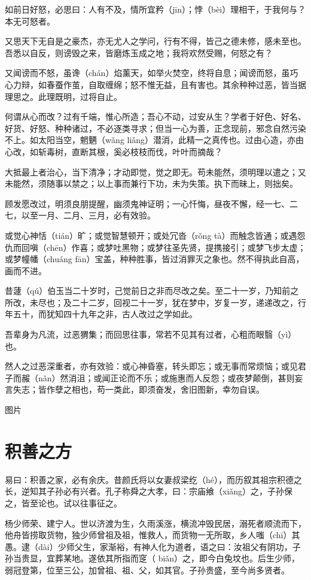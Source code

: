 \documentclass[12pt,UTF8]{ctexbook}
\begin{document}
如前日好怒，必思曰：人有不及，情所宜矜（jīn）；悖（bèi）理相干，于我何与？本无可怒者。

又思天下无自是之豪杰，亦无尤人之学问，行有不得，皆己之德未修，感未至也。吾悉以自反，则谤毁之来，皆磨炼玉成之地；我将欢然受赐，何怒之有？

又闻谤而不怒，虽谗（chán）焰薰天，如举火焚空，终将自息；闻谤而怒，虽巧心力辩，如春蚕作茧，自取缠绵；怒不惟无益，且有害也。其余种种过恶，皆当据理思之。此理既明，过将自止。

何谓从心而改？过有千端，惟心所造；吾心不动，过安从生？学者于好色、好名、好货、好怒、种种诸过，不必逐类寻求；但当一心为善，正念现前，邪念自然污染不上。如太阳当空，魍魉（wǎng  liǎng）潜消，此精一之真传也。过由心造，亦由心改，如斩毒树，直断其根，奚必枝枝而伐，叶叶而摘哉？

大抵最上者治心，当下清净；才动即觉，觉之即无。苟未能然，须明理以遣之；又未能然，须随事以禁之；以上事而兼行下功，未为失策。执下而昧上，则拙矣。

顾发愿改过，明须良朋提醒，幽须鬼神证明；一心忏悔，昼夜不懈，经一七、二七，以至一月、二月、三月，必有效验。

或觉心神恬（tián）旷；或觉智慧顿开；或处冗沓（rǒng  tà）而触念皆通；或遇怨仇而回嗔（chēn）作喜；或梦吐黑物；或梦往圣先贤，提携接引；或梦飞步太虚；或梦幢幡（chuáng  fān）宝盖，种种胜事，皆过消罪灭之象也。然不得执此自高，画而不进。

昔蘧（qú）伯玉当二十岁时，己觉前日之非而尽改之矣。至二十一岁，乃知前之所改，未尽也；及二十二岁，回视二十一岁，犹在梦中，岁复一岁，递递改之，行年五十，而犹知四十九年之非，古人改过之学如此。

吾辈身为凡流，过恶猬集；而回思往事，常若不见其有过者，心粗而眼翳（yì）也。

然人之过恶深重者，亦有效验：或心神昏塞，转头即忘；或无事而常烦恼；或见君子而赧（nǎn）然消沮；或闻正论而不乐；或施惠而人反怨；或夜梦颠倒，甚则妄言失志；皆作孽之相也，苟一类此，即须奋发，舍旧图新，幸勿自误。

图片

\chapter{积善之方}

易曰：积善之家，必有余庆。昔颜氏将以女妻叔梁纥（hé），而历叙其祖宗积德之长，逆知其子孙必有兴者。孔子称舜之大孝，曰：宗庙飨（xiǎng）之，子孙保之，皆至论也。试以往事征之。

杨少师荣、建宁人。世以济渡为生，久雨溪涨，横流冲毁民居，溺死者顺流而下，他舟皆捞取货物，独少师曾祖及祖，惟救人，而货物一无所取，乡人嗤（chī）其愚。逮（dài）少师父生，家渐裕，有神人化为道者，语之曰：汝祖父有阴功，子孙当贵显，宜葬某地。遂依其所指而窆（ biǎn）之，即今白兔坟也。后生少师，弱冠登第，位至三公，加曾祖、祖、父，如其官。子孙贵盛，至今尚多贤者。
\end{document}
